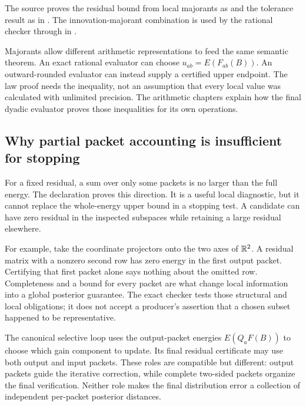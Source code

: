 The source proves the residual bound from local majorants as  and the tolerance result as  in . The innovation-majorant combination is used by the rational checker through  in .

Majorants allow different arithmetic representations to feed the same semantic theorem. An exact rational evaluator can choose $u_{ab}=E(F_{ab}(B))$. An outward-rounded evaluator can instead supply a certified upper endpoint. The law proof needs the inequality, not an assumption that every local value was calculated with unlimited precision. The arithmetic chapters explain how the final dyadic evaluator proves those inequalities for its own operations.

\subsection{Why partial packet accounting is insufficient for stopping}

For a fixed residual, a sum over only some packets is no larger than the full energy. The declaration  proves this direction. It is a useful local diagnostic, but it cannot replace the whole-energy upper bound in a stopping test. A candidate can have zero residual in the inspected subspaces while retaining a large residual elsewhere.

For example, take the coordinate projectors onto the two axes of $\mathbb R^2$. A residual matrix with a nonzero second row has zero energy in the first output packet. Certifying that first packet alone says nothing about the omitted row. Completeness and a bound for every packet are what change local information into a global posterior guarantee. The exact checker tests those structural and local obligations; it does not accept a producer's assertion that a chosen subset happened to be representative.

The canonical selective loop uses the output-packet energies $E(Q_aF(B))$ to choose which gain component to update. Its final residual certificate may use both output and input packets. These roles are compatible but different: output packets guide the iterative correction, while complete two-sided packets organize the final verification. Neither role makes the final distribution error a collection of independent per-packet posterior distances.

